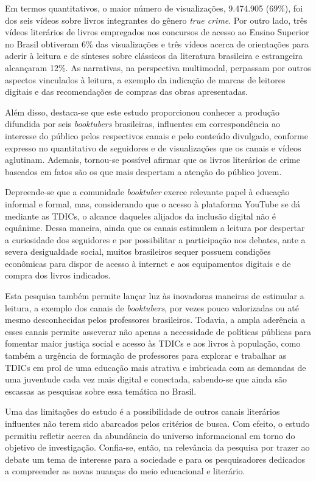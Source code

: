 \documentclass[portuguese]{textolivre}
\begin{document}
Em termos quantitativos, o maior número de visualizações, 9.474.905
(69\%), foi dos seis vídeos sobre livros integrantes do gênero
\emph{true crime}. Por outro lado, três vídeos literários de livros
empregados nos concursos de acesso ao Ensino Superior no Brasil
obtiveram 6\% das visualizações e três vídeos acerca de orientações para
aderir à leitura e de sínteses sobre clássicos da literatura brasileira
e estrangeira alcançaram 12\%. As narrativas, na perspectiva multimodal,
perpassam por outros aspectos vinculados à leitura, a exemplo da
indicação de marcas de leitores digitais e das recomendações de compras
das obras apresentadas.

Além disso, destaca-se que este estudo proporcionou conhecer a produção
difundida por seis \emph{booktubers} brasileiras, influentes em
correspondência ao interesse do público pelos respectivos canais e pelo
conteúdo divulgado, conforme expresso no quantitativo de seguidores e de
visualizações que os canais e vídeos aglutinam. Ademais, tornou-se
possível afirmar que os livros literários de crime baseados em fatos são
os que mais despertam a atenção do público jovem.

Depreende-se que a comunidade \emph{booktuber} exerce relevante papel à
educação informal e formal, mas, considerando que o acesso à plataforma
YouTube se dá mediante as TDICs, o alcance daqueles alijados da inclusão
digital não é equânime. Dessa maneira, ainda que os canais estimulem a
leitura por despertar a curiosidade dos seguidores e por possibilitar a
participação nos debates, ante a severa desigualdade social, muitos
brasileiros sequer possuem condições econômicas para dispor de acesso à
internet e aos equipamentos digitais e de compra dos livros indicados.

Esta pesquisa também permite lançar luz às inovadoras maneiras de
estimular a leitura, a exemplo dos canais de \emph{booktubers}, por
vezes pouco valorizadas ou até mesmo desconhecidas pelos professores
brasileiros. Todavia, a ampla aderência a esses canais permite asseverar
não apenas a necessidade de políticas públicas para fomentar maior
justiça social e acesso às TDICs e aos livros à população, como também a
urgência de formação de professores para explorar e trabalhar as TDICs
em prol de uma educação mais atrativa e imbricada com as demandas de uma
juventude cada vez mais digital e conectada, sabendo-se que ainda são
escassas as pesquisas sobre essa temática no Brasil.

Uma das limitações do estudo é a possibilidade de outros canais
literários influentes não terem sido abarcados pelos critérios de busca.
Com efeito, o estudo permitiu refletir acerca da abundância do universo
informacional em torno do objetivo de investigação. Confia-se, então, na
relevância da pesquisa por trazer ao debate um tema de interesse para a
sociedade e para os pesquisadores dedicados a compreender as novas
nuanças do meio educacional e literário.
\end{document}
